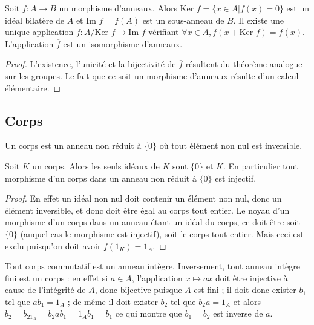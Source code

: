 \begin{thm}
Soit $f : A \rightarrow B$ un morphisme
d'anneaux. Alors
$\text{Ker } f = \{x \in A | f(x) = 0\}$ est un idéal bilatère de $A$ et
$\text{Im } f = f(A)$ est un
sous-anneau de $B$. Il existe une unique application
$\overline{f} : A/\text{Ker } f \rightarrow \text{Im } f$ vérifiant
$\forall x \in A, \overline{f}(x + \text{Ker } f) = f(x)$.
L'application $\overline{f}$ est un isomorphisme
d'anneaux.
\end{thm}

\begin{proof}
L'existence, l'unicité et la bijectivité de
$\overline{f}$ résultent du théorème analogue sur les
groupes. Le fait que ce soit un morphisme d'anneaux résulte d'un calcul
élémentaire.
\end{proof}

\subsection{Corps}

\begin{de}
Un corps est un anneau non réduit à
$\{0\}$ où tout élément non nul est
inversible.
\end{de}

\begin{prop}
Soit $K$ un corps. Alors les seuls idéaux de $K$ sont
$\{0\}$ et $K$. En particulier tout
morphisme d'un corps dans un anneau non réduit à
$\{0\}$ est injectif.
\end{prop}

\begin{proof}
En effet un idéal non nul doit contenir un élément non
nul, donc un élément inversible, et donc doit être égal au corps tout
entier. Le noyau d'un morphisme d'un corps dans un anneau étant un idéal
du corps, ce doit être soit $\{0\}$
(auquel cas le morphisme est injectif), soit le corps tout entier. Mais
ceci est exclu puisqu'on doit avoir $f(1_K) = 1_A$.
\end{proof}

\begin{rem}
Tout corps commutatif est un anneau intègre. Inversement,
tout anneau intègre fini est un corps : en effet si $a \in A$, l'application
$x \mapsto ax$ doit être injective à cause de
l'intégrité de $A$, donc bijective puisque $A$ est fini ; il doit donc
exister $b_1$ tel que $ab_1 = 1_A$ ; de même il
doit exister $b_2$ tel que $b_2a = 1_A$ et alors
$b_2 = b_21_A = b_2ab_1 = 1_Ab_1 = b_1$ ce qui montre que $b_1 = b_2$ est inverse de $a$.
\end{rem}

